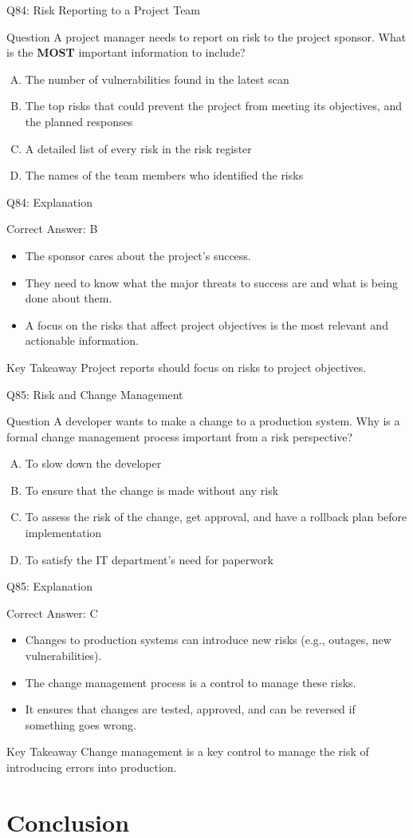 \documentclass[aspectratio=169]{beamer}
\newcommand{\hq}[7]{%
	\begin{frame}{Q#1: #2}
		\begin{block}{Question}
			#3
		\end{block}
		\begin{enumerate}[(A)]
			#4
		\end{enumerate}
	\end{frame}
	\begin{frame}{Q#1: Explanation}
		\begin{block}{Correct Answer: #5}
			\begin{itemize}
				#6
			\end{itemize}
		\end{block}
		\begin{alertblock}{Key Takeaway}
			#7
		\end{alertblock}
	\end{frame}
}
\begin{document}
	\hq{84}{Risk Reporting to a Project Team}
	{A project manager needs to report on risk to the project sponsor. What is the \textbf{MOST} important information to include?}
	{\item The number of vulnerabilities found in the latest scan
		\item The top risks that could prevent the project from meeting its objectives, and the planned responses
		\item A detailed list of every risk in the risk register
		\item The names of the team members who identified the risks}
	{B}
	{\item The sponsor cares about the project's success.
		\item They need to know what the major threats to success are and what is being done about them.
		\item A focus on the risks that affect project objectives is the most relevant and actionable information.}
	{Project reports should focus on risks to project objectives.}
	
	\hq{85}{Risk and Change Management}
	{A developer wants to make a change to a production system. Why is a formal change management process important from a risk perspective?}
	{\item To slow down the developer
		\item To ensure that the change is made without any risk
		\item To assess the risk of the change, get approval, and have a rollback plan before implementation
		\item To satisfy the IT department's need for paperwork}
	{C}
	{\item Changes to production systems can introduce new risks (e.g., outages, new vulnerabilities).
		\item The change management process is a control to manage these risks.
		\item It ensures that changes are tested, approved, and can be reversed if something goes wrong.}
	{Change management is a key control to manage the risk of introducing errors into production.}
	
	\section{Conclusion}
	
\end{document}

